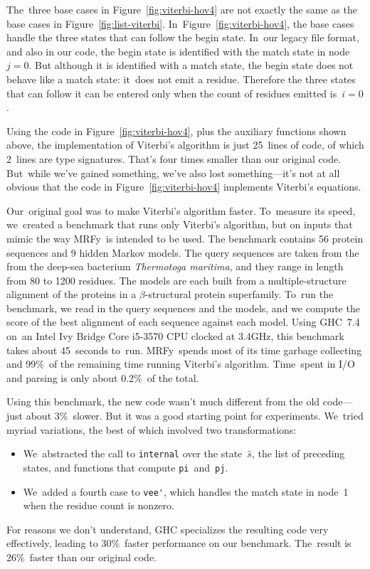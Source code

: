 \documentclass[]{jfp1}
\newcommand\mrfy{MRFy} %
\newcommand\figref[1]{Figure~\ref{fig:#1}}
\begin{document}
The~three base cases in \figref{viterbi-hov4} are not exactly the same
as the base cases in \figref{list-viterbi}.
In~\figref{viterbi-hov4}, the base cases
handle the three states that can
follow the begin state.
In~our legacy file format, and also in our code, the begin state is
identified with the match state in node~$j=0$.
But although it is
identified with a match state, the begin state does not behave like a
match state: it~does not emit a residue.
Therefore the three states that can follow it can be entered only when the
count of residues emitted is~$i=0$.

Using the code in \figref{viterbi-hov4}, plus the auxiliary functions
shown above, the implementation of Viterbi's algorithm is just
25~lines of code, of which 2~lines are type signatures.
That's four times smaller than our original code.
But~while we've gained something, we've also lost something---it's not
at all obvious that the code in \figref{viterbi-hov4}  implements
Viterbi's equations.

Our~original goal was to make Viterbi's algorithm faster.
To~measure its speed, we~created a benchmark that runs only Viterbi's
algorithm, but on inputs that mimic the way \mrfy\ is intended to be used.
The benchmark contains 56 protein sequences and 9 hidden Markov
models.
The query sequences are taken from the from the deep-sea 
bacterium \emph{Thermotoga maritima}, and they 
range in length from 80 to 1200 residues.
The models are each built from a multiple-structure alignment of the
proteins in 
a $\beta$-structural protein superfamily.
To~run the benchmark, we read in the query sequences and the models,
and we compute the score of the best alignment of each sequence
against each model.
Using GHC~7.4 on~an Intel Ivy Bridge Core i5-3570 CPU clocked at
3.4GHz, this benchmark takes about 45~seconds to~run.
\mrfy\ spends most of its time garbage collecting and 99\%\ of the
remaining time running Viterbi's algorithm.
Time~spent in I/O and parsing is only about 0.2\%~of the
total.

Using this benchmark, the new code wasn't much different from the old
code---just about 3\%~slower.
But it 
was a good starting point for experiments.
We~tried myriad variations, 
the best of which involved two transformations:
\begin{itemize}
\item
We~abstracted the call to \texttt{internal} over the state~$\hat s$,
the list of preceding states, and functions that
compute \texttt{pi}~and~\texttt{pj}.
\item
We~added a fourth case to \verb+vee'+, which handles the match
state in node~1 when the residue count is nonzero.
\end{itemize}
For reasons we don't understand, GHC specializes the resulting code
very effectively, leading to 30\%~faster performance on our
benchmark.
The~result is 26\%~faster than our original code.
\end{document}
